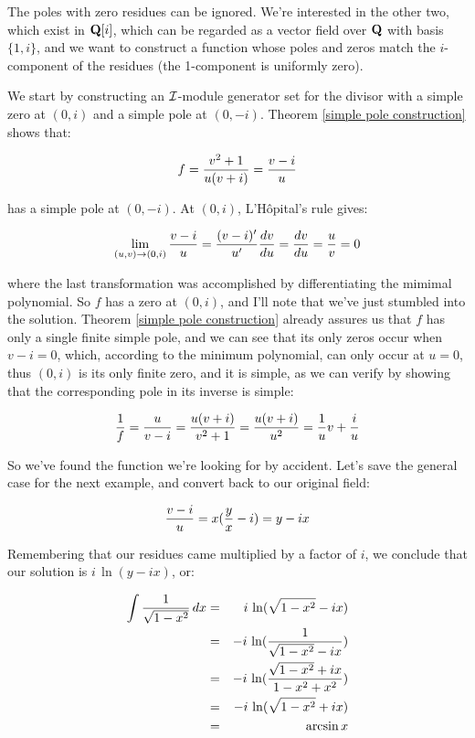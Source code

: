 The poles with zero residues can be ignored.  We're interested in the
other two, which exist in ${\bf Q}[i]$, which can be regarded as a
vector field over ${\bf Q}$ with basis $\{1, i\}$, and we want to
construct a function whose poles and zeros match the $i$-component of
the residues (the 1-component is uniformly zero).

We start by constructing an ${\cal I}$-module generator set for the divisor
with a simple zero at $(0,i)$ and a simple pole at $(0,-i)$.  Theorem
\ref{simple pole construction} shows that:

$$f = {{v^2+1}\over{u(v+i)}} = {{v-i}\over{u}} $$

has a simple pole at $(0,-i)$.  At $(0,i)$, L'H\^opital's rule gives:

$$ \lim_{(u,v)\to (0,i)} {{v-i}\over{u}}
   = {{(v-i)'}\over{u'}} {{dv}\over{du}} = {{dv}\over{du}} = {u\over v} = 0 $$

where the last transformation was accomplished by differentiating the
mimimal polynomial.  So $f$ has a zero at $(0,i)$, and I'll note that
we've just stumbled into the solution.  Theorem \ref{simple pole
construction} already assures us that $f$ has only a single finite
simple pole, and we can see that its only zeros occur when
$v-i=0$, which, according to the minimum polynomial, can only
occur at $u=0$, thus $(0,i)$ is its only finite zero, and it is
simple, as we can verify by showing that the corresponding pole in its
inverse is simple:

$$ {1\over f} = {u\over{v-i}} = {{u(v+i)}\over{v^2+1}}
  = {{u(v+i)}\over{u^2}} = {1\over u}v + {i\over u} $$


So we've found the function we're looking for by accident.  Let's save the
general case for the next example, and convert back to
our original field:

$${{v-i}\over{u}} = x({y\over x}-i) = y - ix $$

Remembering that our residues came multiplied by a factor of $i$, we
conclude that our solution is $i\,\ln(y-ix)$, or:

\begin{eqnarray*}
\int {1\over{\sqrt{1-x^2}}} \,dx &=& i\,\ln(\sqrt{1-x^2}-ix) \\
                                 &=& -i\,\ln({1\over{\sqrt{1-x^2}-ix}}) \\
                                 &=& -i\,\ln({{\sqrt{1-x^2}+ix}\over{1-x^2+x^2}}) \\
                                 &=& -i\,\ln({\sqrt{1-x^2}+ix}) \\
                                 &=& \arcsin x \\
\end{eqnarray*}

